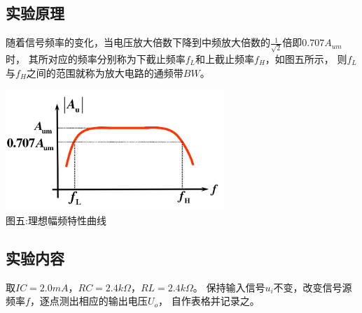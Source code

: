 \documentclass[a4paper]{article}
\begin{document}
    \subsection{实验原理}\label{subsec:13}
    {{随着信号频率的变化，当电压放大倍数下降到中频放大倍数的$\frac{1}{\sqrt{2}}$倍即$0.707A_{um}$时，
    其所对应的频率分别称为下截止频率$f_L$和上截止频率$f_H$，如图五所示，
    则$f_L$与$f_H$之间的范围就称为放大电路的通频带$BW$。}}
    \begin{center}
        \includegraphics[height=130pt]{Af}\\
        {\small 图五:理想幅频特性曲线}
    \end{center}

    \subsection{实验内容}\label{subsec:14}
    {{取$IC=2.0mA$，$RC=2.4k\Omega$，$RL=2.4k\Omega$。
    保持输入信号$u_i$不变，改变信号源频率$f$，逐点测出相应的输出电压$U_o$，
    自作表格并记录之。}}
\end{document}
